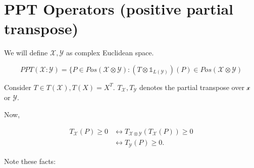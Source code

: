 \documentclass{article}
\begin{document}
\section{PPT Operators (positive partial transpose)}
We will define $\mathcal{X},\mathcal{Y}$ as complex Euclidean space.

\[ 
    PPT(\mathcal{X}:\mathcal{Y}) = \{ P \in Pos(\mathcal{X}\otimes \mathcal{Y})
            : \left( T \otimes \mathds{1}_{L(\mathcal{Y})} \right) (P) \in
            Pos(\mathcal{X}\otimes \mathcal{Y})
\]

Consider $ T \in T(\mathcal{X}), T(X) = X^T$. $T_{\mathcal{X}}, T_{\mathcal{Y}}$
denotes the partial transpose over $\mathcal{x}$ or $\mathcal{Y}$.

Now, 

\begin{align*}
    T_{\mathcal{X}}(P) \ge 0 &\leftrightarrow T_{\mathcal{X}\otimes \mathcal{Y}}
    \left( T_{\mathcal{X}} \left( P \right)\right) \ge 0 \\
    &\leftrightarrow T_{\mathcal{Y}} \left(
        P\right) \ge 0.
\end{align*}

Note these facts:
\end{document}
